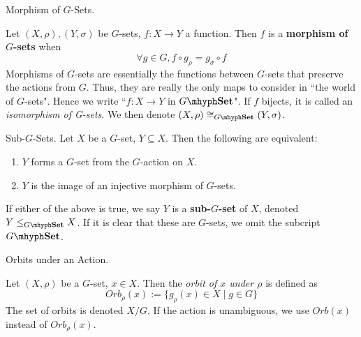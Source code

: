 \documentclass[../book.tex]{subfiles}
\begin{document}
\begin{dfn} Morphism of $G$-Sets. 

    Let $(X,\rho), (Y,\sigma)$ be $G$-sets, $f : X \to Y$ a function. 
    Then $f$ is a \textbf{morphism of $G$-sets} when
    \[
        \forall g \in G, f \circ g_\rho = g_\sigma \circ f
    \]
    Morphisms of $G$-sets are essentially 
    the functions between $G$-sets that preserve the actions from $G$. 
    Thus, they are really the only maps to consider in ``the world of $G$-sets".
    Hence we write ``$f : X \to Y$ in $G\mhyph\Set$". 
    If $f$ bijects, it is called an \emph{isomorphism of G-sets}. 
    We then denote $(X,\rho) \iso_{G\mhyph\Set} (Y,\sigma)$. 
    
\end{dfn}


\begin{dfn} Sub-$G$-Sets.
    Let $X$ be a $G$-set, $Y \subseteq X$. 
    Then the following are equivalent: 
    \begin{enumerate}
        \item $Y$ forms a $G$-set from the $G$-action on $X$.
        \item $Y$ is the image of an injective morphism of $G$-sets.
    \end{enumerate}
    If either of the above is true, 
    we say $Y$ is a \textbf{sub-$G$-set} of $X$,
    denoted $Y \leq_{G\mhyph\Set} X$. 
    If it is clear that these are $G$-sets, 
    we omit the subcript $G\mhyph\Set$.
    
\end{dfn}

\begin{dfn} Orbits under an Action. 

    Let $(X, \rho)$ be a $G$-set, $x \in X$. 
    Then the \emph{orbit of $x$ under $\rho$} is defined as
    \[
        Orb_\rho(x) := \{g_\rho(x) \in X \mid g \in G\}
    \]
    The set of orbits is denoted $X / G$.
    If the action is unambiguous, we use $Orb(x)$ instead of $Orb_\rho(x)$. 

\end{dfn}

\end{document}
